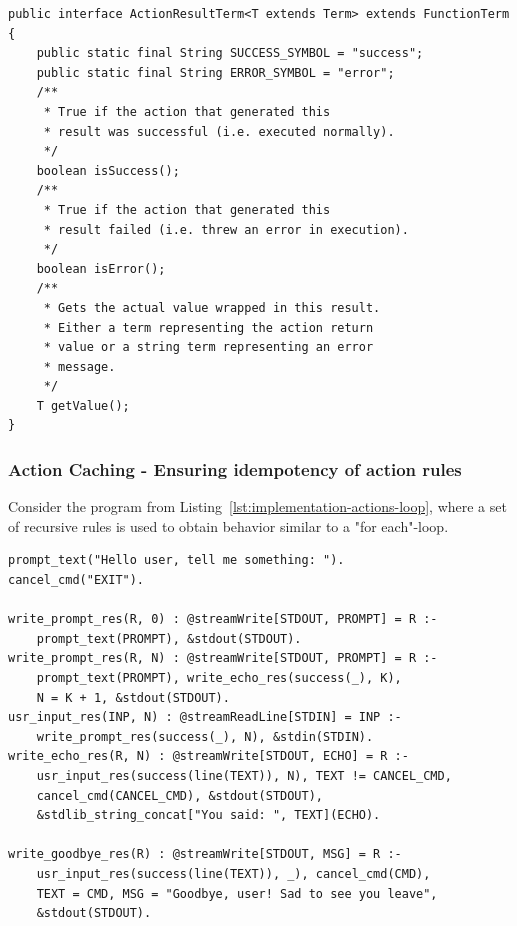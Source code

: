 \begin{lstlisting}[style=java, label={lst:implementation-actions-actionfunc}, caption={Java definition of an action result term.}]
public interface ActionResultTerm<T extends Term> extends FunctionTerm {
    public static final String SUCCESS_SYMBOL = "success";
    public static final String ERROR_SYMBOL = "error";
    /**
     * True if the action that generated this 
     * result was successful (i.e. executed normally).
     */
    boolean isSuccess();
    /**
     * True if the action that generated this 
     * result failed (i.e. threw an error in execution).
     */
    boolean isError();
    /**
     * Gets the actual value wrapped in this result.
     * Either a term representing the action return 
     * value or a string term representing an error
     * message.
     */
    T getValue();
}    
\end{lstlisting}   




\subsubsection{Action Caching - Ensuring idempotency of action rules}
\label{subsubsec:implementation-actions-caching}

Consider the program from Listing~\ref{lst:implementation-actions-loop}, where a set of recursive rules is used to obtain behavior similar to a "for each"-loop.

\begin{lstlisting}[style=asp-code, label={lst:implementation-actions-loop}, caption={An "echo" application which echoes user input written using Evolog actions.}]
prompt_text("Hello user, tell me something: ").
cancel_cmd("EXIT").
    
write_prompt_res(R, 0) : @streamWrite[STDOUT, PROMPT] = R :- 
    prompt_text(PROMPT), &stdout(STDOUT).
write_prompt_res(R, N) : @streamWrite[STDOUT, PROMPT] = R :- 
    prompt_text(PROMPT), write_echo_res(success(_), K), 
    N = K + 1, &stdout(STDOUT).
usr_input_res(INP, N) : @streamReadLine[STDIN] = INP :- 
    write_prompt_res(success(_), N), &stdin(STDIN).
write_echo_res(R, N) : @streamWrite[STDOUT, ECHO] = R :- 
    usr_input_res(success(line(TEXT)), N), TEXT != CANCEL_CMD, 
    cancel_cmd(CANCEL_CMD), &stdout(STDOUT),
    &stdlib_string_concat["You said: ", TEXT](ECHO).
        
write_goodbye_res(R) : @streamWrite[STDOUT, MSG] = R :- 
    usr_input_res(success(line(TEXT)), _), cancel_cmd(CMD), 
    TEXT = CMD, MSG = "Goodbye, user! Sad to see you leave", 
    &stdout(STDOUT).   
\end{lstlisting}    


